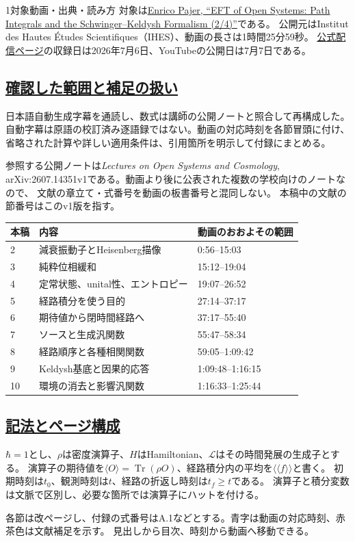 \documentclass[a4paper,11pt]{ltjsarticle}
\newcommand{\subsectionlink}[1]{\subsection[#1]{\hyperlink{toc}{#1}}}
\numberwithin{equation}{section}
\newcommand{\Tr}{\operatorname{Tr}}
\newcommand{\av}[1]{\langle #1\rangle}
\newcommand{\pav}[1]{\langle\!\langle #1\rangle\!\rangle}
\begin{document}
\begin{lecturesection}{1}{対象動画・出典・読み方}
\label{sec:scope}
対象は\href{https://www.youtube.com/watch?v=RYxzcUhIHjk}{Enrico Pajer, ``EFT of Open Systems:
Path Integrals and the Schwinger--Keldysh Formalism (2/4)''}である。
公開元はInstitut des Hautes Études Scientifiques（IHES）、動画の長さは1時間25分59秒。
\href{https://www.carmin.tv/en/video/eft-of-open-systems-path-integrals-and-the-schwinger-keldysh-formalism-2-4}{公式配信ページ}の収録日は2026年7月6日、YouTubeの公開日は7月7日である。

\subsectionlink{確認した範囲と補足の扱い}
日本語自動生成字幕を通読し、数式は講師の公開ノート\cite{Pajer:2026fuo}と照合して再構成した。
自動字幕は原語の校訂済み逐語録ではない。動画の対応時刻を各節冒頭に付け、
省略された計算や詳しい適用条件は、引用箇所を明示して付録にまとめる。

参照する公開ノートは\emph{Lectures on Open Systems and Cosmology},
arXiv:2607.14351v1である。動画より後に公表された複数の学校向けのノートなので、
文献の章立て・式番号を動画の板書番号と混同しない。
本稿中の文献の節番号はこのv1版を指す。

\begin{longtable}{@{}p{}p{}p{}@{}}
\toprule 本稿 & 内容 & 動画のおおよその範囲\\\midrule\endhead
2 & 減衰振動子とHeisenberg描像 & 0:56--15:03\\
3 & 純粋位相緩和 & 15:12--19:04\\
4 & 定常状態、unital性、エントロピー & 19:07--26:52\\
5 & 経路積分を使う目的 & 27:14--37:17\\
6 & 期待値から閉時間経路へ & 37:17--55:40\\
7 & ソースと生成汎関数 & 55:47--58:34\\
8 & 経路順序と各種相関関数 & 59:05--1:09:42\\
9 & Keldysh基底と因果的応答 & 1:09:48--1:16:15\\
10 & 環境の消去と影響汎関数 & 1:16:33--1:25:44\\\bottomrule
\end{longtable}

\subsectionlink{記法とページ構成}
$\hbar=1$とし、$\rho$は密度演算子、$H$はHamiltonian、$\mathcal L$はその時間発展の生成子とする。
演算子の期待値を$\av{O}=\Tr(\rho O)$、経路積分内の平均を$\pav{f}$と書く。
初期時刻は$t_0$、観測時刻は$t$、経路の折返し時刻は$t_f\ge t$である。
演算子と積分変数は文脈で区別し、必要な箇所では演算子にハットを付ける。

各節は改ページし、付録の式番号はA.1などとする。青字は動画の対応時刻、赤茶色は文献補足を示す。
見出しから目次、時刻から動画へ移動できる。
\end{lecturesection}
\end{document}
